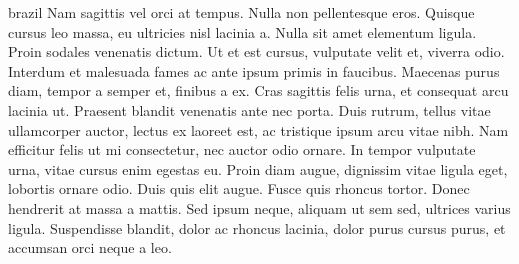 \begin{otherlanguage*}{brazil}
    Nam sagittis vel orci at tempus. Nulla non pellentesque eros.  Quisque
    cursus leo massa, eu ultricies nisl lacinia a. Nulla sit amet elementum
    ligula.  Proin sodales venenatis dictum. Ut et est cursus, vulputate
    velit et, viverra odio. Interdum et malesuada fames ac ante ipsum primis
    in faucibus. Maecenas purus diam, tempor a semper et, finibus a ex. Cras
    sagittis felis urna, et consequat arcu lacinia ut. Praesent blandit
    venenatis ante nec porta. Duis rutrum, tellus vitae ullamcorper auctor,
    lectus ex laoreet est, ac tristique ipsum arcu vitae nibh. Nam efficitur
    felis ut mi consectetur, nec auctor odio ornare. In tempor vulputate
    urna, vitae cursus enim egestas eu. Proin diam augue, dignissim vitae
    ligula eget, lobortis ornare odio. Duis quis elit augue. Fusce quis
    rhoncus tortor. Donec hendrerit at massa a mattis. Sed ipsum neque,
    aliquam ut sem sed, ultrices varius ligula. Suspendisse blandit, dolor
    ac rhoncus lacinia, dolor purus cursus purus, et accumsan orci neque a
    leo.

    {\begin{inparaitem}[]\palavrasChavePortugues\end{inparaitem}}

  \end{otherlanguage*}


\else
\fi

\makeatother

